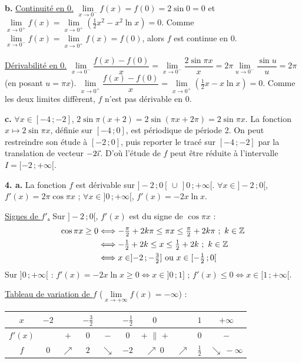 \documentclass[11pt]{article}
\begin{document}
\textbf{b.} \underline{Continuité en 0.} $\lim\limits_{x\to 0^-} f(x) = f(0) = 2\sin 0 = 0$ et $\lim\limits_{x\to 0^+} f(x) = \lim\limits_{x\to 0^+}\left(\tfrac{1}{2}x^2 - x^2\ln x\right) = 0$. Comme $\lim\limits_{x\to 0^-} f(x) = \lim\limits_{x\to 0^+} f(x) = f(0)$, alors $f$ est continue en 0.

\underline{Dérivabilité en 0.} $\lim\limits_{x\to 0^-}\dfrac{f(x) - f(0)}{x} = \lim\limits_{x\to 0^-}\dfrac{2\sin\pi x}{x} = 2\pi\lim\limits_{u\to 0^-}\dfrac{\sin u}{u} = 2\pi$ (en posant $u = \pi x$). $\lim\limits_{x\to 0^+}\dfrac{f(x) - f(0)}{x} = \lim\limits_{x\to 0^+}\left(\tfrac{1}{2}x - x\ln x\right) = 0$. Comme les deux limites diffèrent, $f$ n'est pas dérivable en 0.

\textbf{c.} $\forall x \in [-4\,;-2]$, $2\sin\pi(x+2) = 2\sin(\pi x + 2\pi) = 2\sin\pi x$. La fonction $x \mapsto 2\sin\pi x$, définie sur $[-4\,;0]$, est périodique de période 2. On peut restreindre son étude à $[-2\,;0]$, puis reporter le tracé sur $[-4\,;-2]$ par la translation de vecteur $-2\vec{\imath}$. D'où l'étude de $f$ peut être réduite à l'intervalle $I = [-2\,;+\infty[$.

\textbf{4. a.} La fonction $f$ est dérivable sur $]-2\,;0[\,\cup\,]0\,;+\infty[$. $\forall x \in ]-2\,;0[$, $f'(x) = 2\pi\cos\pi x$ ; $\forall x \in ]0\,;+\infty[$, $f'(x) = -2x\ln x$.

\underline{Signes de $f'$.} Sur $]-2\,;0[$, $f'(x)$ est du signe de $\cos\pi x$ :
\begin{align*}
\cos\pi x \ge 0 &\Longleftrightarrow -\tfrac{\pi}{2} + 2k\pi \le \pi x \le \tfrac{\pi}{2} + 2k\pi\ ;\ k \in \Z \\
&\Longleftrightarrow -\tfrac{1}{2} + 2k \le x \le \tfrac{1}{2} + 2k\ ;\ k \in \Z \\
&\Longleftrightarrow x \in ]{-2}\,;-\tfrac{3}{2}] \text{ ou } x \in [-\tfrac{1}{2}\,;0[
\end{align*}
Sur $]0\,;+\infty[$ : $f'(x) = -2x\ln x \ge 0 \Leftrightarrow x \in ]0\,;1]$ ; $f'(x) \le 0 \Leftrightarrow x \in [1\,;+\infty[$.

\underline{Tableau de variation de $f$} ($\lim\limits_{x\to+\infty} f(x) = -\infty$) :
\begin{center}
\renewcommand{\arraystretch}{1.4}
\begin{tabular}{|c|ccccccccc|}
\hline
$x$ & $-2$ & & $-\frac{3}{2}$ & & $-\frac{1}{2}$ & $0$ & & $1$ & $+\infty$ \\
\hline
$f'(x)$ & & $+$ & $0$ & $-$ & $0$ & $+$ \;$\|$\; $+$ & & $0$ & $-$ \\
\hline
$f$ & $0$ & $\nearrow$ & $2$ & $\searrow$ & $-2$ & $\nearrow\ 0$ & $\nearrow$ & $\frac{1}{2}$ & $\searrow\ -\infty$ \\
\hline
\end{tabular}
\end{center}
\end{document}
